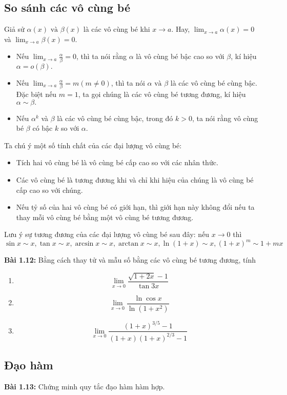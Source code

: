 \subsection*{So sánh các vô cùng bé}
 Giả sử \(\alpha(x)\text{ và }\beta(x)\) là các vô cùng bé khi $x\rightarrow a$. Hay, \(\lim_{x\rightarrow a}\alpha(x)=0\) và \(\lim_{x\rightarrow a}\beta(x)=0\).
\begin{itemize}
    \item Nếu \(\lim_{x\rightarrow a}\frac{\alpha}{\beta}=0\), thì ta nói rằng $\alpha$ là vô cùng bé bậc cao so với $\beta$, kí hiệu $\alpha=o(\beta).$ 
    \item Nếu \(\lim_{x\rightarrow a}\frac{\alpha}{\beta}=m ( m\neq 0)\), thì ta nói \(\alpha\text{ và }\beta\) là các vô cùng bé cùng bậc. Đặc biệt nếu \(m=1\), ta gọi chúng là các vô cùng bé tương đương, kí hiệu $\alpha\sim \beta.$
    \item Nếu \(\alpha^k\) và \(\beta\) là các vô cùng bé cùng bậc, trong đó \(k>0\), ta nói rằng vô cùng bé \(\beta\) có bậc \(k\) so với \(\alpha\).
\end{itemize}
Ta chú ý một số tính chất của các đại lượng vô cùng bé:
\begin{itemize}
    \item Tích hai vô cùng bé là vô cùng bé cấp cao so với các nhân thức.
    \item Các vô cùng bé là tương đương khi và chỉ khi hiệu của chúng là vô cùng bé cấp cao so với chúng.
    \item Nếu tỷ số của hai vô cùng bé có giới hạn, thì giới hạn này không đổi nếu ta thay mỗi vô cùng bé bằng một vô cùng bé tương đương.
\end{itemize}
Lưu ý sự tương đương của các đại lượng vô cùng bé sau đây: nếu \(x\rightarrow 0\) thì \[\sin x\sim x, \tan x\sim x, \arcsin x\sim x, \arctan x\sim x, \ln(1+x)\sim x, (1+x)^m\sim 1+mx\]

\textbf{Bài 1.12:} 
Bằng cách thay tử và mẫu số bằng các vô cùng bé tương đương, tính 
\begin{enumerate}[label=(\alph*)]
    \item \[\lim_{x\rightarrow 0}\frac{\sqrt{1+2x}-1}{\tan 3x}\]
    \item \[\lim_{x\rightarrow 0}\frac{\ln \cos x}{\ln (1+x^2)}\]
    \item \[\lim_{x\rightarrow 0}\frac{(1+x)^{3/5}-1}{(1+x)(1+x)^{2/3}-1}\]
\end{enumerate}

\subsection*{Đạo hàm}
\textbf{Bài 1.13:} Chứng minh quy tắc đạo hàm hàm hợp.
\vspace{5pt}

